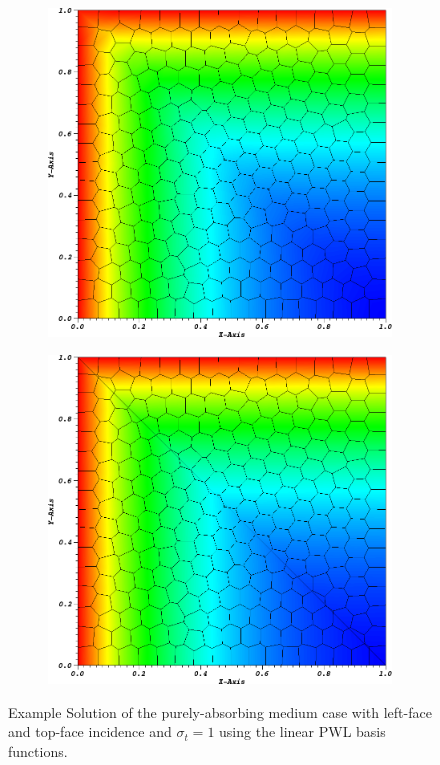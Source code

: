 \begin{figure}
{\begin{subfigure}[b]{0.485\textwidth}
	\end{subfigure}
}
\vspace{1cm}
{
	\begin{subfigure}[b]{0.485\textwidth}
		\centering
		\label{subfig::PA_Mesh_Poly}
		\includegraphics[width=\textwidth]{figures/sec_BF/PALeftTopSol_Poly.png}
	\end{subfigure}
	\hfill
	\begin{subfigure}[b]{0.485\textwidth}
		\centering
		\label{subfig::PA_Mesh_SplitPoly}
		\includegraphics[width=\textwidth]{figures/sec_BF/PALeftTopSol_SplitPoly.png}
	\end{subfigure}
}
\caption{Example Solution of the purely-absorbing medium case with left-face and top-face incidence and $\sigma_t=1$ using the linear PWL basis functions.}
\label{fig::BF_Results_PA_LeftTop_Solutions}
\end{figure}

